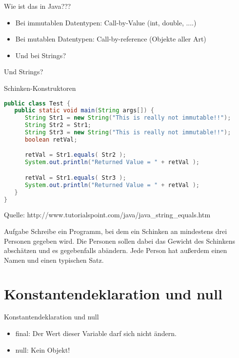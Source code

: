\documentclass[18pt]{beamer}
\begin{document}
\begin{frame}{Wie ist das in Java???}
\begin{itemize}
 \item Bei immutablen Datentypen: Call-by-Value (int, double, ....)
 \pause
 \item Bei mutablen Datentypen: Call-by-reference (Objekte aller Art)
 \pause
 \item Und bei Strings?
\end{itemize}

\end{frame}


\begin{frame}[fragile]{Und Strings?}
\begin{exampleblock}{Schinken-Konstruktoren}
\begin{lstlisting}[language=java] 
public class Test {
   public static void main(String args[]) {
      String Str1 = new String("This is really not immutable!!");
      String Str2 = Str1;
      String Str3 = new String("This is really not immutable!!");
      boolean retVal;

      retVal = Str1.equals( Str2 );
      System.out.println("Returned Value = " + retVal );

      retVal = Str1.equals( Str3 );
      System.out.println("Returned Value = " + retVal );
   }
}
\end{lstlisting}
\end{exampleblock}
\footnotesize Quelle: http://www.tutorialspoint.com/java/java\_string\_equals.htm
\end{frame}

\begin{frame}{Aufgabe}
 Schreibe ein Programm, bei dem ein Schinken an mindestens drei Personen gegeben wird. 
 Die Personen sollen dabei das Gewicht des Schinkens abschätzen und es gegebenfalls abändern.
 Jede Person hat außerdem einen Namen und einen typischen Satz.
\end{frame}


\section{Konstantendeklaration und null}
\begin{frame}{Konstantendeklaration und null}
\begin{itemize}
 \item final: Der Wert dieser Variable darf sich nicht ändern.
 \item null: Kein Objekt!
\end{itemize}
\end{frame}
\end{document}
